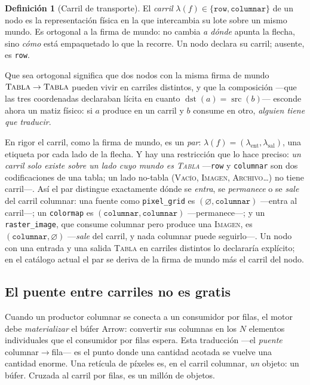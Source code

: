 \documentclass[11pt,a4paper]{article}
\theoremstyle{definition}
\newtheorem{definicion}{Definición}[section]
\theoremstyle{plain}
\newcommand{\mundo}[1]{\textsc{#1}}   %
\begin{document}
\begin{definicion}[Carril de transporte]
El \emph{carril} $\lambda(f)\in\{\texttt{row},\texttt{columnar}\}$ de un nodo es la
representación física en la que intercambia su lote sobre un mismo mundo. Es
ortogonal a la firma de mundo: no cambia \emph{a dónde} apunta la flecha, sino
\emph{cómo} está empaquetado lo que la recorre. Un nodo declara su carril; ausente,
es \texttt{row}.
\end{definicion}

Que sea ortogonal significa que dos nodos con la misma firma de mundo
$\mundo{Tabla}\to\mundo{Tabla}$ pueden vivir en carriles distintos, y que la
composición ---que las tres coordenadas declaraban lícita en cuanto
$\operatorname{dst}(a)=\operatorname{src}(b)$--- esconde ahora un matiz físico: si
$a$ produce en un carril y $b$ consume en otro, \emph{alguien tiene que traducir}.

En rigor el carril, como la firma de mundo, es un \emph{par}: $\lambda(f) =
(\lambda_{\mathrm{ent}}, \lambda_{\mathrm{sal}})$, una etiqueta por cada lado de la
flecha. Y hay una restricción que lo hace preciso: \emph{un carril solo existe sobre
un lado cuyo mundo es \mundo{Tabla}} ---\texttt{row} y \texttt{columnar} son dos
codificaciones de una tabla; un lado no-tabla (\mundo{Vacío}, \mundo{Imagen},
\mundo{Archivo}\dots) no tiene carril---. Así el par distingue exactamente dónde se
\emph{entra}, se \emph{permanece} o se \emph{sale} del carril columnar: una fuente
como \texttt{pixel\_grid} es $(\varnothing, \texttt{columnar})$ ---entra al carril---;
un \texttt{colormap} es $(\texttt{columnar},\texttt{columnar})$ ---permanece---; y un
\texttt{raster\_image}, que consume columnar pero produce una \mundo{Imagen}, es
$(\texttt{columnar}, \varnothing)$ ---\emph{sale} del carril, y nada columnar puede
seguirlo---. Un nodo con una entrada y una salida \mundo{Tabla} en carriles distintos
lo declararía explícito; en el catálogo actual el par se deriva de la firma de mundo
más el carril del nodo.

\subsection{El puente entre carriles no es gratis}

Cuando un productor columnar se conecta a un consumidor por filas, el motor debe
\emph{materializar} el búfer Arrow: convertir sus columnas en los $N$ elementos
individuales que el consumidor por filas espera. Esta traducción ---el \emph{puente}
columnar$\to$fila--- es el punto donde una cantidad acotada se vuelve una cantidad
enorme. Una retícula de píxeles es, en el carril columnar, \emph{un} objeto: un
búfer. Cruzada al carril por filas, es un millón de objetos.
\end{document}
